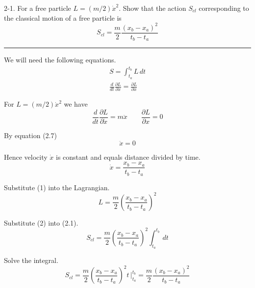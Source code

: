 \documentclass[12pt]{article}
\begin{document}
2-1.
For a free particle $L=(m/2)\dot x^2.$
Show that the action $S_{cl}$ corresponding to the classical motion
of a free particle is
\begin{equation*}
S_{cl}=\frac{m}{2}\frac{(x_b-x_a)^2}{t_b-t_a}
\tag{2.8}
\end{equation*}

\bigskip
\hrule

\bigskip
We will need the following equations.
\begin{gather*}
S=\int_{t_a}^{t_b} L\,dt
\tag{2.1}
\\
\frac{d}{dt}\frac{\partial L}{\partial\dot x}=\frac{\partial L}{\partial x}
\tag{2.7}
\end{gather*}

For $L=(m/2)\dot x^2$ we have
\begin{equation*}
\frac{d}{dt}\frac{\partial L}{\partial\dot x}=m\ddot x
\qquad
\frac{\partial L}{\partial x}=0
\end{equation*}

By equation (2.7)
\begin{equation*}
\ddot x=0
\end{equation*}

Hence velocity $\dot x$ is constant and equals distance divided by time.
\begin{equation*}
\dot x=\frac{x_b-x_a}{t_b-t_a}
\tag{1}
\end{equation*}

Substitute (1) into the Lagrangian.
\begin{equation*}
L=\frac{m}{2}\left(\frac{x_b-x_a}{t_b-t_a}\right)^2
\tag{2}
\end{equation*}

Substitute (2) into (2.1).
\begin{equation*}
S_{cl}=\frac{m}{2}\left(\frac{x_b-x_a}{t_b-t_a}\right)^2\int_{t_a}^{t_b}\,dt
\tag{3}
\end{equation*}

Solve the integral.
\begin{equation*}
S_{cl}
=\frac{m}{2}\left(\frac{x_b-x_a}{t_b-t_a}\right)^2 t\,\bigg|_{t_a}^{t_b}
=\frac{m}{2}\frac{(x_b-x_a)^2}{t_b-t_a}
\end{equation*}
\end{document}

